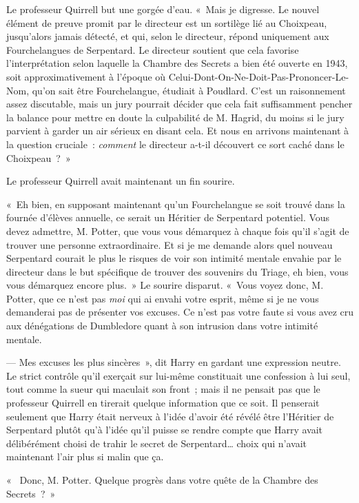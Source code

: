 Le professeur Quirrell but une gorgée d'eau. «~Mais je digresse. Le nouvel élément de preuve promit par le directeur est un sortilège lié au Choixpeau, jusqu'alors jamais détecté, et qui, selon le directeur, répond uniquement aux Fourchelangues de Serpentard. Le directeur soutient que cela favorise l'interprétation selon laquelle la Chambre des Secrets a bien été ouverte en 1943, soit approximativement à l'époque où Celui-Dont-On-Ne-Doit-Pas-Prononcer-Le-Nom, qu'on sait être Fourchelangue, étudiait à Poudlard. C'est un raisonnement assez discutable, mais un jury pourrait décider que cela fait suffisamment pencher la balance pour mettre en doute la culpabilité de M. Hagrid, du moins si le jury parvient à garder un air sérieux en disant cela. Et nous en arrivons maintenant à la question cruciale~: \emph{comment} le directeur a-t-il découvert ce sort caché dans le Choixpeau~?~»

Le professeur Quirrell avait maintenant un fin sourire.

«~Eh bien, en supposant maintenant qu'un Fourchelangue se soit trouvé dans la fournée d'élèves annuelle, ce serait un Héritier de Serpentard potentiel. Vous devez admettre, M. Potter, que vous vous démarquez à chaque fois qu'il s'agit de trouver une personne extraordinaire. Et si je me demande alors quel nouveau Serpentard courait le plus le risques de voir son intimité mentale envahie par le directeur dans le but spécifique de trouver des souvenirs du Triage, eh bien, vous vous démarquez encore plus.~» Le sourire disparut. «~Vous voyez donc, M. Potter, que ce n'est pas \emph{moi} qui ai envahi votre esprit, même si je ne vous demanderai pas de présenter vos excuses. Ce n'est pas votre faute si vous avez cru aux dénégations de Dumbledore quant à son intrusion dans votre intimité mentale.

--- Mes excuses les plus sincères~», dit Harry en gardant une expression neutre. Le strict contrôle qu'il exerçait sur lui-même constituait une confession à lui seul, tout comme la sueur qui maculait son front~; mais il ne pensait pas que le professeur Quirrell en tirerait quelque information que ce soit. Il penserait seulement que Harry était nerveux à l'idée d'avoir été révélé être l'Héritier de Serpentard plutôt qu'à l'idée qu'il puisse se rendre compte que Harry avait délibérément choisi de trahir le secret de Serpentard… choix qui n'avait maintenant l'air plus si malin que ça.

«~ Donc, M. Potter. Quelque progrès dans votre quête de la Chambre des Secrets~?~»


